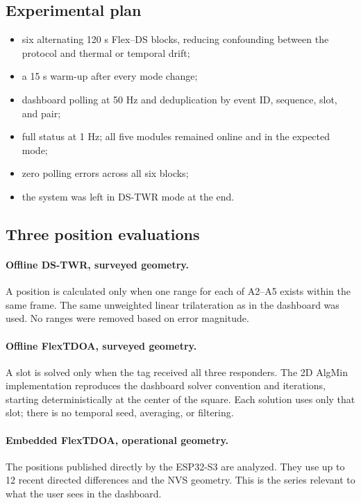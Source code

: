 \documentclass[11pt,a4paper]{article}
\begin{document}
\subsection{Experimental plan}

\begin{itemize}[leftmargin=6mm]
  \item six alternating 120 s Flex--DS blocks, reducing confounding between
  the protocol and thermal or temporal drift;
  \item a 15 s warm-up after every mode change;
  \item dashboard polling at 50 Hz and deduplication by event ID, sequence,
  slot, and pair;
  \item full status at 1 Hz; all five modules remained online and in the
  expected mode;
  \item zero polling errors across all six blocks;
  \item the system was left in DS-TWR mode at the end.
\end{itemize}

\subsection{Three position evaluations}

\paragraph{Offline DS-TWR, surveyed geometry.}
A position is calculated only when one range for each of A2--A5 exists within
the same frame. The same unweighted linear trilateration as in the dashboard
was used. No ranges were removed based on error magnitude.

\paragraph{Offline FlexTDOA, surveyed geometry.}
A slot is solved only when the tag received all three responders. The 2D
AlgMin implementation reproduces the dashboard solver convention and
iterations, starting deterministically at the center of the square. Each
solution uses only that slot; there is no temporal seed, averaging, or
filtering.

\paragraph{Embedded FlexTDOA, operational geometry.}
The positions published directly by the ESP32-S3 are analyzed. They use up to
12 recent directed differences and the NVS geometry. This is the series
relevant to what the user sees in the dashboard.
\end{document}
